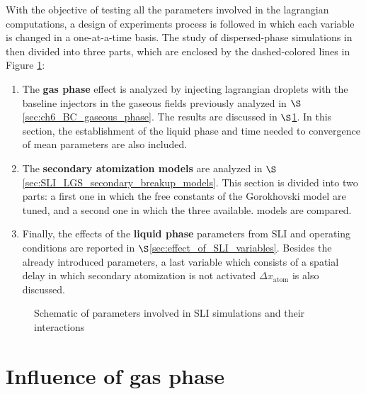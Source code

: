 With the objective of testing all the parameters involved in the lagrangian computations, a design of experiments process is followed in which each variable is changed in a one-at-a-time basis. The study of dispersed-phase simulations in then divided into three parts, which are enclosed by the dashed-colored lines in Figure  \ref{fig:dispersed_phase_sli_parameters}:

\begin{enumerate}

	\item The \textbf{gas phase} effect is analyzed by injecting lagrangian droplets with the baseline injectors in the gaseous fields previously analyzed in $\S$\ref{sec:ch6_BC_gaseous_phase}. The results are discussed in $\S$\ref{sec:SLI_LGS_gaseous_phase_effect}. In this section, the establishment of the liquid phase and time needed to convergence of mean parameters are also  included.
	
	\item The \textbf{secondary atomization models} are analyzed in $\S$\ref{sec:SLI_LGS_secondary_breakup_models}. This section is divided into two parts: a first one in which the free constants of the Gorokhovski model are tuned, and a second one in which the three available. models are compared.
	
	\item Finally, the effects of the \textbf{liquid phase} parameters from SLI and operating conditions are reported in $\S$\ref{sec:effect_of_SLI_variables}. Besides the already introduced parameters, a last variable which consists of a spatial delay in which secondary atomization is not activated $\Delta x_\mathrm{atom}$ is also discussed.

\end{enumerate}

\clearpage

\begin{figure}[ht]	
	\centering	{}
	\caption{Schematic of parameters involved in SLI simulations and their interactions}	\label{fig:dispersed_phase_sli_parameters}
\end{figure}


\section{Influence of gas phase}
\label{sec:SLI_LGS_gaseous_phase_effect}

